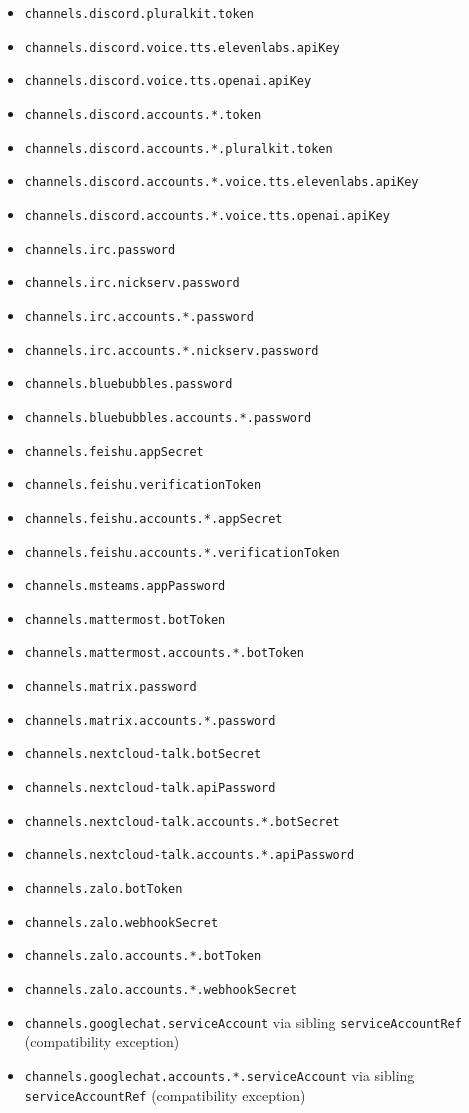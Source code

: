 \begin{itemize}
  \item \texttt{channels.discord.pluralkit.token}
  \item \texttt{channels.discord.voice.tts.elevenlabs.apiKey}
  \item \texttt{channels.discord.voice.tts.openai.apiKey}
  \item \texttt{channels.discord.accounts.*.token}
  \item \texttt{channels.discord.accounts.*.pluralkit.token}
  \item \texttt{channels.discord.accounts.*.voice.tts.elevenlabs.apiKey}
  \item \texttt{channels.discord.accounts.*.voice.tts.openai.apiKey}
  \item \texttt{channels.irc.password}
  \item \texttt{channels.irc.nickserv.password}
  \item \texttt{channels.irc.accounts.*.password}
  \item \texttt{channels.irc.accounts.*.nickserv.password}
  \item \texttt{channels.bluebubbles.password}
  \item \texttt{channels.bluebubbles.accounts.*.password}
  \item \texttt{channels.feishu.appSecret}
  \item \texttt{channels.feishu.verificationToken}
  \item \texttt{channels.feishu.accounts.*.appSecret}
  \item \texttt{channels.feishu.accounts.*.verificationToken}
  \item \texttt{channels.msteams.appPassword}
  \item \texttt{channels.mattermost.botToken}
  \item \texttt{channels.mattermost.accounts.*.botToken}
  \item \texttt{channels.matrix.password}
  \item \texttt{channels.matrix.accounts.*.password}
  \item \texttt{channels.nextcloud-talk.botSecret}
  \item \texttt{channels.nextcloud-talk.apiPassword}
  \item \texttt{channels.nextcloud-talk.accounts.*.botSecret}
  \item \texttt{channels.nextcloud-talk.accounts.*.apiPassword}
  \item \texttt{channels.zalo.botToken}
  \item \texttt{channels.zalo.webhookSecret}
  \item \texttt{channels.zalo.accounts.*.botToken}
  \item \texttt{channels.zalo.accounts.*.webhookSecret}
  \item \texttt{channels.googlechat.serviceAccount} via sibling \texttt{serviceAccountRef} (compatibility exception)
  \item \texttt{channels.googlechat.accounts.*.serviceAccount} via sibling \texttt{serviceAccountRef} (compatibility exception)
\end{itemize}


